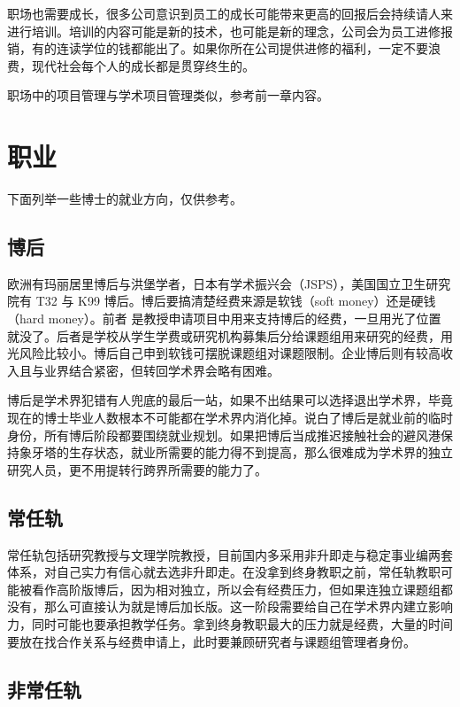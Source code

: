 \documentclass[]{tufte-book}
\begin{document}
职场也需要成长，很多公司意识到员工的成长可能带来更高的回报后会持续请人来进行培训。培训的内容可能是新的技术，也可能是新的理念，公司会为员工进修报销，有的连读学位的钱都能出了。如果你所在公司提供进修的福利，一定不要浪费，现代社会每个人的成长都是贯穿终生的。

职场中的项目管理与学术项目管理类似，参考前一章内容。

\hypertarget{ux804cux4e1a}{%
\section{职业}\label{ux804cux4e1a}}

下面列举一些博士的就业方向，仅供参考。

\hypertarget{ux535aux540e}{%
\subsection{博后}\label{ux535aux540e}}

欧洲有玛丽居里博后与洪堡学者，日本有学术振兴会（JSPS），美国国立卫生研究院有 T32 与 K99 博后。博后要搞清楚经费来源是软钱（soft money）还是硬钱（hard money）。前者 是教授申请项目中用来支持博后的经费，一旦用光了位置就没了。后者是学校从学生学费或研究机构募集后分给课题组用来研究的经费，用光风险比较小。博后自己申到软钱可摆脱课题组对课题限制。企业博后则有较高收入且与业界结合紧密，但转回学术界会略有困难。

博后是学术界犯错有人兜底的最后一站，如果不出结果可以选择退出学术界，毕竟现在的博士毕业人数根本不可能都在学术界内消化掉。说白了博后是就业前的临时身份，所有博后阶段都要围绕就业规划。如果把博后当成推迟接触社会的避风港保持象牙塔的生存状态，就业所需要的能力得不到提高，那么很难成为学术界的独立研究人员，更不用提转行跨界所需要的能力了。

\hypertarget{ux5e38ux4efbux8f68}{%
\subsection{常任轨}\label{ux5e38ux4efbux8f68}}

常任轨包括研究教授与文理学院教授，目前国内多采用非升即走与稳定事业编两套体系，对自己实力有信心就去选非升即走。在没拿到终身教职之前，常任轨教职可能被看作高阶版博后，因为相对独立，所以会有经费压力，但如果连独立课题组都没有，那么可直接认为就是博后加长版。这一阶段需要给自己在学术界内建立影响力，同时可能也要承担教学任务。拿到终身教职最大的压力就是经费，大量的时间要放在找合作关系与经费申请上，此时要兼顾研究者与课题组管理者身份。

\hypertarget{ux975eux5e38ux4efbux8f68}{%
\subsection{非常任轨}\label{ux975eux5e38ux4efbux8f68}}
\end{document}
